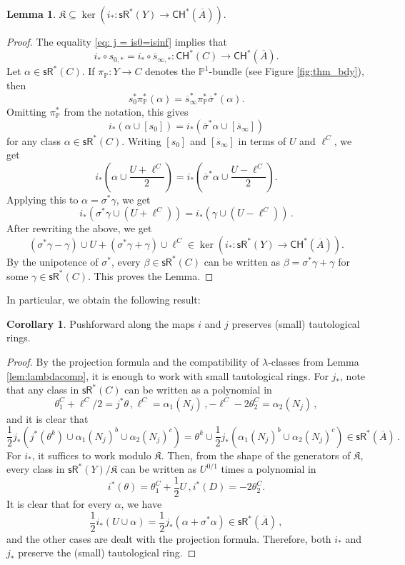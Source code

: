 \documentclass[11pt]{article}
\def\CH{\mathsf{CH}}
\def\sR{\mathsf{sR}}
\newcommand{\barA}{\overline{A}}
\newcommand{\sbar}{\overline{s}}
\newcommand{\sh}{\sigma}
\newcommand{\shb}{\overline{\sh}}
\theoremstyle{definition}
\newtheorem{corollary}[definition]{Corollary}
\newtheorem{lemma}[definition]{Lemma}
\begin{document}
\begin{lemma}\label{lem:K-in-ker}
    $\mathfrak{K}\subseteq \ker (i_* : \sR^*(Y) \to \CH^*(\barA) )$.
\end{lemma}

\begin{proof}
    The equality \eqref{eq: j = is0=isinf} implies that
$$
i_*\circ s_{0,*} = i_*\circ \overline{s}_{\infty,*} : \CH^*(C) \to \CH^*(\barA).
$$
Let $\alpha \in \sR^*(C)$. If $\pi_{\mathbb{P}} : Y \to C$ denotes the $\mathbb P^1$-bundle (see Figure \ref{fig:thm_bdy}), then
$$
s_0^* \pi_{\mathbb{P}}^*(\alpha) = \overline{s}_{\infty}^*\pi_{\mathbb{P}}^*\shb^*(\alpha).
$$
Omitting $\pi_{\mathbb{P}}^*$ from the notation, this gives
$$
i_*(\alpha\cup [s_0]) = i_*(\shb^*\alpha \cup [\sbar_{\infty}])
$$
for any class $\alpha \in \sR^*(C)$. Writing $[s_0]$ and $[\sbar_{\infty}]$ in terms of $U$ and $\ell^C$, we get
$$
i_*\left(\alpha\cup \frac{U+\ell^C}{2}\right) = i_*\left(\shb^*\alpha \cup \frac{U-\ell^C}{2}\right).
$$
Applying this to $\alpha=\sh^*\gamma$, we get
$$
i_*\left(\sh^*\gamma\cup (U+\ell^C)\right) = i_*\left(\gamma \cup (U-\ell^C)\right)\, .
$$
After rewriting the above, we get
$$
(\sh^*\gamma - \gamma) \cup U +(\sh^*\gamma + \gamma) \cup \ell^C \in \ker (i_* : \sR^*(Y) \to \CH^*(\barA) ).
$$
By the unipotence of $\sh^*$, every $\beta\in \sR^{\ast}(C)$ can be written as $\beta=\sh^*\gamma+\gamma$ for some $\gamma\in \sR^{\ast}(C)$. This proves the Lemma.
\end{proof}

In particular, we obtain the following result:

\begin{corollary}\label{cor:i_* in sR}
    Pushforward along the maps $i$ and $j$ preserves (small) tautological rings.
\end{corollary}

\begin{proof}
    By the projection formula and the compatibility of $\lambda$-classes from Lemma \ref{lem:lambdacomp}, it is enough to work with small tautological rings. For $j_*$, note that any class in $\sR^*(C)$ can be written as a polynomial in
    $$
    \theta_1^C + \ell^C/2 = j^*\theta\, , \ell^C = \alpha_1(N_j)\, ,-\ell^C - 2\theta_2^C = \alpha_2(N_j)\, ,
    $$
	and it is clear that
    $$
    \frac{1}{2}j_*(j^*(\theta^k)\cup\alpha_1(N_j)^b\cup\alpha_2(N_j)^c) = \theta^k\cup\frac{1}{2}j_*(\alpha_1(N_j)^b\cup\alpha_2(N_j)^c) \in \sR^*(\barA)\, .
    $$
    For $i_*$, it suffices to work modulo $\mathfrak K$. Then, from the shape of the generators of $\mathfrak K$, every class in $\sR^*(Y)/\mathfrak K$ can be written as $U^{0/1}$ times a polynomial in
    $$
    i^*(\theta) = \theta_1^C + \frac{1}{2}U\, ,i^*(D) = -2\theta_{2}^C.
    $$
    It is clear that for every $\alpha$, we have
    $$
    \frac{1}{2}i_*(U\cup\alpha) = \frac{1}{2}j_*(\alpha + \sh^*\alpha) \in \sR^*(\barA)\, ,
    $$
    and the other cases are dealt with the projection formula. Therefore, both $i_*$ and $j_*$ preserve the (small) tautological ring.
\end{proof}
\end{document}
